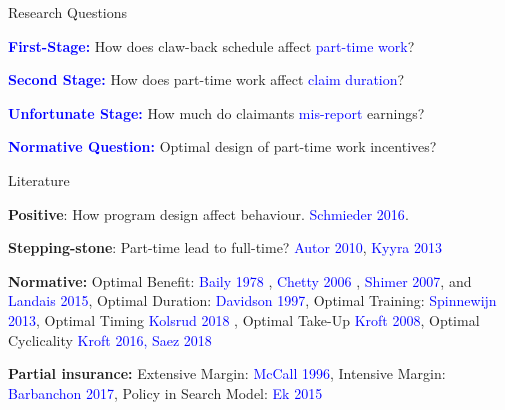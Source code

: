 \documentclass{beamer}
\newenvironment{widelist}{\itemize\addtolength{\itemsep}{16pt}}{\enditemize}
\begin{document}
\begin{frame}{Research Questions}

\begin{widelist}
	
	\item<1-> \textcolor{blue}{\textbf{First-Stage:}} How does claw-back schedule affect \textcolor{blue}{part-time work}?

	\item <2-> \textcolor{blue}{\textbf{Second Stage:}} How does part-time work affect \textcolor{blue}{claim duration}?
	
	\item <3-> \textcolor{blue}{\textbf{Unfortunate Stage:}} How much do claimants \textcolor{blue}{mis-report} earnings?
	
	\item <4-> \textcolor{blue}{\textbf{Normative Question:}} Optimal design of part-time work incentives?
\end{widelist}
\end{frame}


\begin{frame}{Literature}
\begin{widelist}
	\item \textbf{Positive}: How program design affect behaviour. \textcolor{blue}{Schmieder 2016}.
	\item \textbf{Stepping-stone}: Part-time lead to full-time? \textcolor{blue}{Autor 2010}, \textcolor{blue}{Kyyra 2013}
	\item \textbf{Normative:} Optimal Benefit: \textcolor{blue}{Baily 1978} , \textcolor{blue}{Chetty 2006 }, \textcolor{blue}{Shimer 2007}, and \textcolor{blue}{Landais 2015}, Optimal Duration: \textcolor{blue}{Davidson 1997}, Optimal Training: \textcolor{blue}{Spinnewijn 2013}, Optimal Timing \textcolor{blue}{Kolsrud 2018 }, Optimal Take-Up \textcolor{blue}{Kroft 2008}, Optimal Cyclicality \textcolor{blue}{Kroft 2016, Saez 2018}
	\item \textbf{Partial insurance:} Extensive Margin: \textcolor{blue}{McCall 1996}, Intensive Margin: \textcolor{blue}{Barbanchon 2017}, Policy in Search Model: \textcolor{blue}{Ek 2015} 

\end{widelist}
\end{frame}

\end{document}
